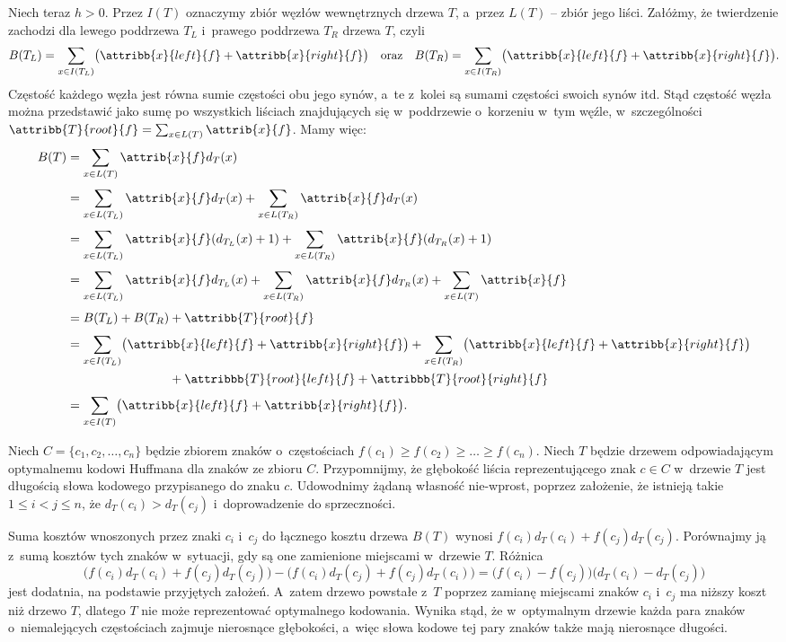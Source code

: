 Niech teraz $h>0$.
Przez $I(T)$ oznaczymy zbiór węzłów wewnętrznych drzewa $T$, a~przez $L(T)$ -- zbiór jego liści.
Załóżmy, że twierdzenie zachodzi dla lewego poddrzewa $T_L$ i~prawego poddrzewa $T_R$ drzewa $T$, czyli
\[
	B(T_L) = \sum_{x\in I(T_L)}\bigl(\attribb{x}{left}{f}+\attribb{x}{right}{f}\bigr) \quad\text{oraz}\quad B(T_R) = \sum_{x\in I(T_R)}\bigl(\attribb{x}{left}{f}+\attribb{x}{right}{f}\bigr).
\]
Częstość każdego węzła jest równa sumie częstości obu jego synów, a~te z~kolei są sumami częstości swoich synów itd.
Stąd częstość węzła można przedstawić jako sumę po wszystkich liściach znajdujących się w~poddrzewie o~korzeniu w~tym węźle, w~szczególności $\attribb{T}{root}{f}=\sum_{x\in L(T)}\attrib{x}{f}$.
Mamy więc:
\begin{align*}
	B(T) &= \sum_{x\in L(T)}\attrib{x}{f}d_T(x) \\[1mm]
	&= \sum_{x\in L(T_L)}\attrib{x}{f}d_T(x)+\sum_{x\in L(T_R)}\attrib{x}{f}d_T(x) \\[1mm]
	&= \sum_{x\in L(T_L)}\attrib{x}{f}(d_{T_L}(x)+1)+\sum_{x\in L(T_R)}\attrib{x}{f}(d_{T_R}(x)+1) \\[1mm]
	&= \sum_{x\in L(T_L)}\attrib{x}{f}d_{T_L}(x)+\sum_{x\in L(T_R)}\attrib{x}{f}d_{T_R}(x)+\sum_{x\in L(T)}\attrib{x}{f} \\[1mm]
	&= B(T_L)+B(T_R)+\attribb{T}{root}{f} \\[1mm]
	&= \sum_{x\in I(T_L)}\bigl(\attribb{x}{left}{f}+\attribb{x}{right}{f}\bigr)+\sum_{x\in I(T_R)}\bigl(\attribb{x}{left}{f}+\attribb{x}{right}{f}\bigr) \\
	& \phantom{{}=B(T_L)+B(T_R)}+\attribbb{T}{root}{left}{f}+\attribbb{T}{root}{right}{f} \\[1mm]
	&= \sum_{x\in I(T)}\bigl(\attribb{x}{left}{f}+\attribb{x}{right}{f}\bigr).
\end{align*}

\exercise %
Niech $C=\{c_1,c_2,\dots,c_n\}$ będzie zbiorem znaków o~częstościach $f(c_1)\ge f(c_2)\ge\dots\ge f(c_n)$.
Niech $T$ będzie drzewem odpowiadającym optymalnemu kodowi Huffmana dla znaków ze zbioru $C$.
Przypomnijmy, że głębokość liścia reprezentującego znak $c\in C$ w~drzewie $T$ jest długością słowa kodowego przypisanego do znaku $c$.
Udowodnimy żądaną własność nie-wprost, poprzez założenie, że istnieją takie $1\le i<j\le n$, że $d_T(c_i)>d_T(c_j)$ i~doprowadzenie do sprzeczności.

Suma kosztów wnoszonych przez znaki $c_i$ i~$c_j$ do łącznego kosztu drzewa $B(T)$ wynosi $f(c_i)d_T(c_i)+f(c_j)d_T(c_j)$.
Porównajmy ją z~sumą kosztów tych znaków w~sytuacji, gdy są one zamienione miejscami w~drzewie $T$.
Różnica
\[
	\bigl(f(c_i)d_T(c_i)+f(c_j)d_T(c_j)\bigr)-\bigl(f(c_i)d_T(c_j)+f(c_j)d_T(c_i)\bigr) = \bigl(f(c_i)-f(c_j)\bigr)\bigl(d_T(c_i)-d_T(c_j)\bigr)
\]
jest dodatnia, na podstawie przyjętych założeń.
A~zatem drzewo powstałe z~$T$ poprzez zamianę miejscami znaków $c_i$ i~$c_j$ ma niższy koszt niż drzewo $T$, dlatego $T$ nie może reprezentować optymalnego kodowania.
Wynika stąd, że w~optymalnym drzewie każda para znaków o~niemalejących częstościach zajmuje nierosnące głębokości, a~więc słowa kodowe tej pary znaków także mają nierosnące długości.

